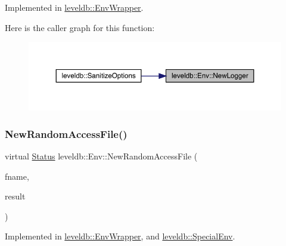 Implemented in \mbox{\hyperlink{classleveldb_1_1_env_wrapper_a5782db35fbf6e1a449b64f3aa43e174d}{leveldb\+::\+Env\+Wrapper}}.

Here is the caller graph for this function\+:
\nopagebreak
\begin{figure}[H]
\begin{center}
\leavevmode
\includegraphics[width=350pt]{classleveldb_1_1_env_a53a4c41d294fe619f13ec5b697ffc933_icgraph}
\end{center}
\end{figure}
\mbox{\label{classleveldb_1_1_env_a1df3e0bb2d47ee914448df9bb9ca0734}} 
\subsubsection{\texorpdfstring{NewRandomAccessFile()}{NewRandomAccessFile()}}
{\footnotesize\ttfamily virtual \mbox{\hyperlink{classleveldb_1_1_status}{Status}} leveldb\+::\+Env\+::\+New\+Random\+Access\+File (\begin{DoxyParamCaption}\item[{const std\+::string \&}]{fname,  }\item[{\mbox{\hyperlink{classleveldb_1_1_random_access_file}{Random\+Access\+File}} $\ast$$\ast$}]{result }\end{DoxyParamCaption})\hspace{0.3cm}{\ttfamily [pure virtual]}}



Implemented in \mbox{\hyperlink{classleveldb_1_1_env_wrapper_ac1143b03917d33af0a946862f6a452fc}{leveldb\+::\+Env\+Wrapper}}, and \mbox{\hyperlink{classleveldb_1_1_special_env_ae04ba2b7b94753d805e316dbda74ec00}{leveldb\+::\+Special\+Env}}.

